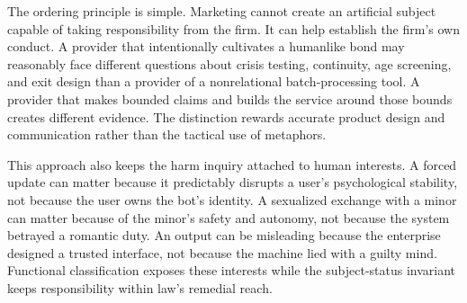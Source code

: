 The ordering principle is simple. Marketing cannot create an artificial subject capable of taking responsibility from the firm. It can help establish the firm's own conduct. A provider that intentionally cultivates a humanlike bond may reasonably face different questions about crisis testing, continuity, age screening, and exit design than a provider of a nonrelational batch-processing tool. A provider that makes bounded claims and builds the service around those bounds creates different evidence. The distinction rewards accurate product design and communication rather than the tactical use of metaphors.

This approach also keeps the harm inquiry attached to human interests. A forced update can matter because it predictably disrupts a user's psychological stability, not because the user owns the bot's identity. A sexualized exchange with a minor can matter because of the minor's safety and autonomy, not because the system betrayed a romantic duty. An output can be misleading because the enterprise designed a trusted interface, not because the machine lied with a guilty mind. Functional classification exposes these interests while the subject-status invariant keeps responsibility within law's remedial reach.
